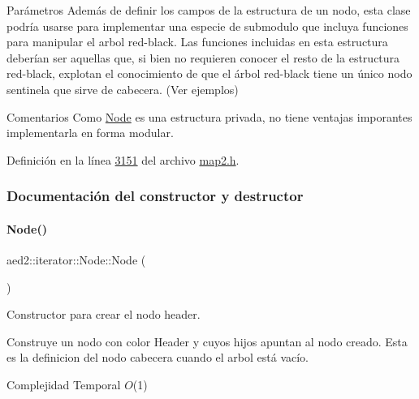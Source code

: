\begin{DoxyParams}{\-Parámetros}
Además de definir los campos de la estructura de un nodo, esta clase podría usarse para implementar una especie de submodulo que incluya funciones para manipular el arbol red-\/black. Las funciones incluidas en esta estructura deberían ser aquellas que, si bien no requieren conocer el resto de la estructura red-\/black, explotan el conocimiento de que el árbol red-\/black tiene un único nodo sentinela que sirve de cabecera. (Ver ejemplos)

\begin{DoxyRemark}{Comentarios}
Como \hyperlink{structaed2_1_1iterator_1_1Node}{Node} es una estructura privada, no tiene ventajas imporantes implementarla en forma modular. 
\end{DoxyRemark}


Definición en la línea \hyperlink{map2_8h_source_l03151}{3151} del archivo \hyperlink{map2_8h_source}{map2.\+h}.



\subsubsection{Documentación del constructor y destructor}
\mbox{\label{structaed2_1_1iterator_1_1Node_a143f108a38e8990d7d60ad48dd521654_a143f108a38e8990d7d60ad48dd521654}} 
\paragraph{\texorpdfstring{Node()}{Node()}\hspace{0.1cm}{\footnotesize\ttfamily [1/2]}}
{\footnotesize\ttfamily aed2\+::iterator\+::\+Node\+::\+Node (\begin{DoxyParamCaption}{ }\end{DoxyParamCaption})\hspace{0.3cm}{\ttfamily [inline]}}



Constructor para crear el nodo header. 

Construye un nodo con color Header y cuyos hijos apuntan al nodo creado. Esta es la definicion del nodo cabecera cuando el arbol está vacío.


\begin{DoxyDescription}
\item[Complejidad Temporal]$O$(1)
\end{DoxyDescription}


\end{DoxyParams}
